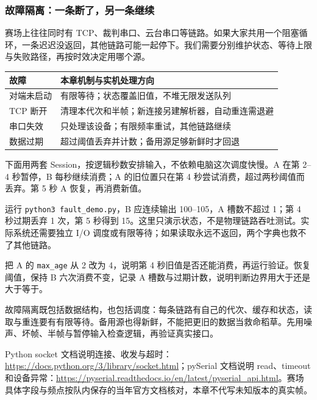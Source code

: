 \subsubsection{故障隔离：一条断了，另一条继续}
赛场上往往同时有 TCP、裁判串口、云台串口等链路。如果大家共用一个阻塞循环，一条迟迟没返回，其他链路可能一起停下。我们需要分别维护状态、等待上限与失败路径，再按时效决定用哪个源。
\begin{center}
\begin{tabular}{lp{}}
\toprule
故障 & 本章机制与实机处理方向 \\
\midrule
对端未启动 & 有限等待；状态覆盖旧值，不堆无限发送队列 \\
TCP 断开 & 清理本代次和半帧；新连接另建解析器，自动重连需退避 \\
串口失效 & 只处理该设备；有限频率重试，其他链路继续 \\
数据过期 & 超过阈值丢弃并计数；备用源足够新鲜时才回退 \\
\bottomrule
\end{tabular}
\end{center}
\begin{example}[暂停 A，看看 B 有没有跟着停]
下面用两套 Session，按逻辑秒数安排输入，不依赖电脑这次调度快慢。A 在第 2--4 秒暂停，B 每秒继续消费；A 的旧位置只在第 4 秒尝试消费，超过两秒阈值而丢弃。第 5 秒 A 恢复，再消费新值。
\begin{commcode}

\end{commcode}
运行 \texttt{python3 fault\_demo.py}，B 应连续输出 100--105，A 槽数不超过 1；第 4 秒过期丢弃 1 次，第 5 秒得到 15。这里只演示状态，不是物理链路吞吐测试。实际系统还需要独立 I/O 调度或有限等待；如果读取永远不返回，两个字典也救不了其他链路。
\end{example}
\begin{exercise}\label{ex:v2-comm-isolation}
把 A 的 \texttt{max\_age} 从 2 改为 4，说明第 4 秒旧值是否还能消费，再运行验证。恢复阈值，保持 B 六次消费不变，记录 A 槽数与过期计数，说明判断边界用大于还是大于等于。
\end{exercise}
\begin{conclusion}
故障隔离既包括数据结构，也包括调度：每条链路有自己的代次、缓存和状态，读取与重连要有有限等待。备用源也得新鲜，不能把更旧的数据当救命稻草。先用噪声、坏帧、半帧与暂停输入检查逻辑，再验证真实接口。
\end{conclusion}

Python socket 文档说明连接、收发与超时：\url{https://docs.python.org/3/library/socket.html}；pySerial 文档说明 read、timeout 和设备异常：\url{https://pyserial.readthedocs.io/en/latest/pyserial_api.html}。赛场具体字段与频点按队内保存的当年官方文档核对，本章不代写未知版本的真实帧。
